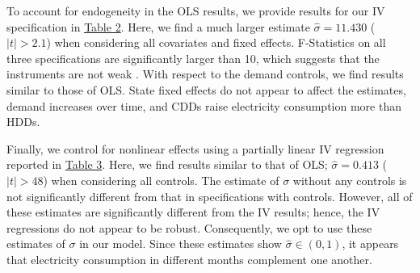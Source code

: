 \documentclass[11pt,a4paper]{extarticle}
\begin{document}
To account for endogeneity in the OLS results, we provide results for our IV specification in \hyperref[table:2]{Table 2}. Here, we find a much larger estimate $\hat{\sigma}  = 11.430$ ($|t| > 2.1$) when considering all covariates and fixed effects. F-Statistics on all three specifications are significantly larger than 10, which suggests that the instruments are not weak \citep{SS1997}. With respect to the demand controls, we find results similar to those of OLS. State fixed effects do not appear to affect the estimates, demand increases over time, and CDDs raise electricity consumption more than HDDs. 

Finally, we control for nonlinear effects using a partially linear IV regression reported in \hyperref[table:3]{Table 3}. Here, we find results similar to that of OLS; $\hat{\sigma} = 0.413$ ($|t| > 48$) when considering all controls. The estimate of $\sigma$ without any controls is not significantly different from that in specifications with controls. However, all of these estimates are significantly different from the IV results; hence, the IV regressions do not appear to be robust. Consequently, we opt to use these estimates of $\sigma$ in our model. Since these estimates show $\hat{\sigma} \in (0,1)$, it appears that electricity consumption in different months complement one another. 
\end{document}
